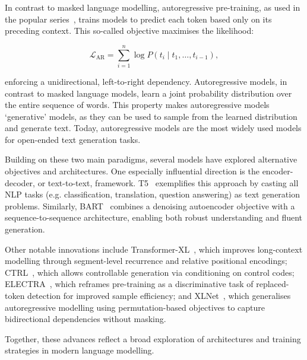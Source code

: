 In contrast to masked language modelling, autoregressive pre-training, as used in the popular  series~\citep{radford2018gpt1, radford2019gpt2, brown2020gpt3}, trains models to predict each token based only on its preceding context. This so-called  objective maximises the likelihood:

\begin{equation}
\mathcal{L}_{\text{AR}} = \sum_{i=1}^n \log P(t_i \mid t_1, \ldots, t_{i-1}),
\label{eq:ar-loss}
\end{equation}

enforcing a unidirectional, left-to-right dependency. Autoregressive models, in contrast to masked language models, learn a joint probability distribution over the entire sequence of words. This property makes autoregressive models `generative' models, as they can be used to sample from the learned distribution and generate text. Today, autoregressive models are the most widely used models for open-ended text generation tasks.

Building on these two main paradigms, several models have explored alternative objectives and architectures. One especially influential direction is the encoder-decoder, or text-to-text, framework. T5~\citep{raffel2020t5} exemplifies this approach by casting all NLP tasks (e.g. classification, translation, question answering) as text generation problems. Similarly, BART~\citep{lewis2020bart} combines a denoising autoencoder objective with a sequence-to-sequence architecture, enabling both robust understanding and fluent generation.

Other notable innovations include Transformer-XL~\citep{dai2019transformer}, which improves long-context modelling through segment-level recurrence and relative positional encodings; CTRL~\citep{keskar2019ctrl}, which allows controllable generation via conditioning on control codes; ELECTRA~\citep{clark2020electra}, which reframes pre-training as a discriminative task of replaced-token detection for improved sample efficiency; and XLNet~\citep{yang2019xlnet}, which generalises autoregressive modelling using permutation-based objectives to capture bidirectional dependencies without masking.

Together, these advances reflect a broad exploration of architectures and training strategies in modern language modelling.

